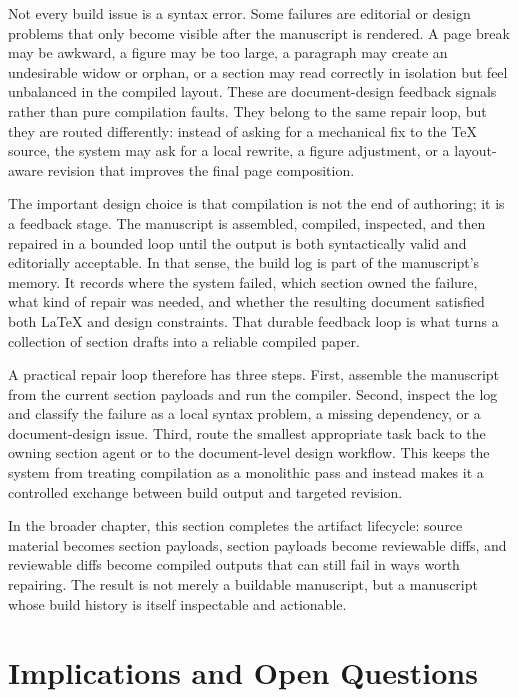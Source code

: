 \documentclass[11pt]{article}
\begin{document}
Not every build issue is a syntax error. Some failures are editorial or design problems that only become visible after the manuscript is rendered. A page break may be awkward, a figure may be too large, a paragraph may create an undesirable widow or orphan, or a section may read correctly in isolation but feel unbalanced in the compiled layout. These are document-design feedback signals rather than pure compilation faults. They belong to the same repair loop, but they are routed differently: instead of asking for a mechanical fix to the TeX source, the system may ask for a local rewrite, a figure adjustment, or a layout-aware revision that improves the final page composition.

The important design choice is that compilation is not the end of authoring; it is a feedback stage. The manuscript is assembled, compiled, inspected, and then repaired in a bounded loop until the output is both syntactically valid and editorially acceptable. In that sense, the build log is part of the manuscript's memory. It records where the system failed, which section owned the failure, what kind of repair was needed, and whether the resulting document satisfied both LaTeX and design constraints. That durable feedback loop is what turns a collection of section drafts into a reliable compiled paper.

A practical repair loop therefore has three steps. First, assemble the manuscript from the current section payloads and run the compiler. Second, inspect the log and classify the failure as a local syntax problem, a missing dependency, or a document-design issue. Third, route the smallest appropriate task back to the owning section agent or to the document-level design workflow. This keeps the system from treating compilation as a monolithic pass and instead makes it a controlled exchange between build output and targeted revision.

In the broader chapter, this section completes the artifact lifecycle: source material becomes section payloads, section payloads become reviewable diffs, and reviewable diffs become compiled outputs that can still fail in ways worth repairing. The result is not merely a buildable manuscript, but a manuscript whose build history is itself inspectable and actionable.



\section{Implications and Open Questions}
\end{document}
